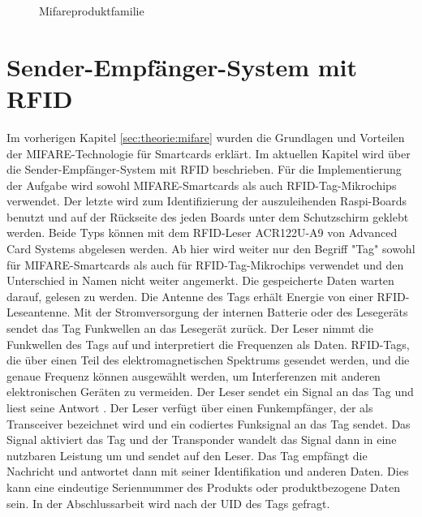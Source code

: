\begin{figure}[h!]
	\centering
	\caption{Mifareproduktfamilie}
	\label{fig:mifare}
\end{figure}

\section{Sender-Empfänger-System mit RFID}
\label{sec:theorie:rfid}
Im vorherigen Kapitel \ref{sec:theorie:mifare} wurden die Grundlagen und Vorteilen der MIFARE-Technologie für Smartcards erklärt. Im aktuellen Kapitel wird über die  Sender-Empfänger-System mit RFID beschrieben. Für die Implementierung der Aufgabe wird sowohl MIFARE-Smartcards als auch RFID-Tag-Mikrochips verwendet. Der letzte wird zum Identifizierung der auszuleihenden Raspi-Boards benutzt und auf der Rückseite des jeden Boards unter dem Schutzschirm geklebt werden. Beide Typs können mit dem RFID-Leser ACR122U-A9 von Advanced Card Systems abgelesen werden. Ab hier wird weiter nur den Begriff "Tag" sowohl für MIFARE-Smartcards als auch für RFID-Tag-Mikrochips verwendet und den Unterschied in Namen nicht weiter angemerkt. Die gespeicherte Daten warten darauf, gelesen zu werden. Die Antenne des Tags erhält Energie von einer RFID-Leseantenne. Mit der Stromversorgung der internen Batterie oder des Lesegeräts sendet das Tag Funkwellen an das Lesegerät zurück. Der Leser nimmt die Funkwellen des Tags auf und interpretiert die Frequenzen als Daten. RFID-Tags, die über einen Teil des elektromagnetischen Spektrums gesendet werden, und die genaue Frequenz können ausgewählt werden, um Interferenzen mit anderen elektronischen Geräten zu vermeiden. Der Leser sendet ein Signal an das Tag und liest seine Antwort \cite{website:13}. Der Leser verfügt über einen Funkempfänger, der als Transceiver bezeichnet wird und ein codiertes Funksignal an das Tag sendet. Das Signal aktiviert das Tag und der Transponder wandelt das Signal dann in eine nutzbaren Leistung um und sendet auf den Leser. Das Tag empfängt die Nachricht und antwortet dann mit seiner Identifikation und anderen Daten. Dies kann eine eindeutige Seriennummer des Produkts oder produktbezogene Daten sein. In der Abschlussarbeit wird nach der UID des Tags gefragt. 

